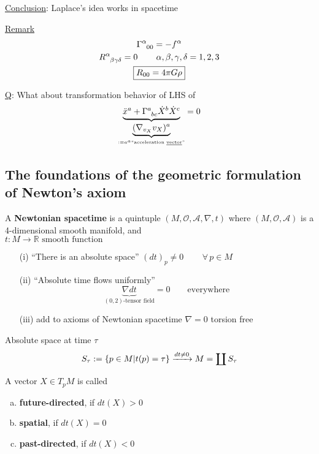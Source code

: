 \underline{Conclusion}: Laplace's idea works in spacetime

\underline{Remark}
\[
\begin{gathered}
  \ccf{\alpha}{00} = -f^{\alpha} \\
  R\indices{^{\alpha}_{\beta \gamma \delta}} = 0 \quad \quad \, \alpha, \beta , \gamma, \delta = 1,2,3 \\
  \boxed{R_{00} = 4 \pi G \rho}
\end{gathered}
\]

\underline{Q}: What about transformation behavior of LHS of
\[
\underbrace{\ddot{x}^a + \ccf{a}{bc} \dot{X}^b \dot{X}^c}_{\underbrace{(\nabla_{v_X}v_X)^a}_{:= a^a \text{``acceleration \underline{vector}''}}} = 0
\]

\subsection{The foundations of the geometric formulation of Newton's axiom}
\begin{definition}
A \textbf{Newtonian spacetime} is a quintuple $(M, \mathcal{O}, \mathcal{A}, \nabla, t)$ where $(M, \mathcal{O}, \mathcal{A})$ is a 4-dimensional smooth manifold, and \\
$t : M \to \mathbb{R} \text{ smooth function }$

\begin{enumerate}
\item[(i)] ``There is an absolute space'' \quad $(dt)_p \neq 0 \quad \quad \, \forall \, p \in M$
\item[(ii)] ``Absolute time flows uniformly''
\[
\underbrace{\nabla dt}_{(0,2)\text{-tensor field}} = 0 \quad \quad \text{everywhere}
\]

\item[(iii)] add to axioms of Newtonian spacetime $\nabla = 0$ torsion free
\end{enumerate}
\end{definition}

\begin{definition}
Absolute space at time $\tau$
\[
S_{\tau} := \lbrace p \in M | t(p) = \tau \rbrace \\
\xrightarrow{dt \neq 0} M = \coprod S_{\tau}
\]
\end{definition}

\begin{definition} A vector $X \in T_pM$ is called
\begin{enumerate}[(a)]
\item \textbf{future-directed}, if $dt(X) > 0$
\item \textbf{spatial}, if $dt(X) = 0$
\item \textbf{past-directed}, if $dt(X) < 0$
\end{enumerate}
\end{definition}

